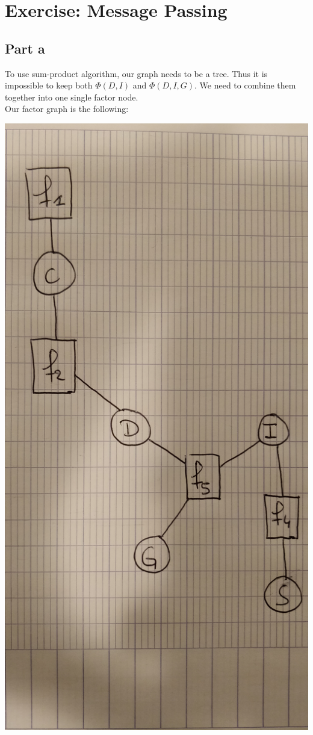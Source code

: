 \documentclass[a4paper, 10pt]{article}
\begin{document}
\section{Exercise: Message Passing}
\subsection{Part a}
To use sum-product algorithm, our graph needs to be a tree. Thus it is impossible to keep
both $\Phi(D,I)$ and $\Phi(D,I,G)$. We need to combine them together into one single factor node.
\\
Our factor graph is the following:
\begin{center}
\includegraphics[angle=90,scale=0.06]{graph1}
\end{center}
\end{document}
